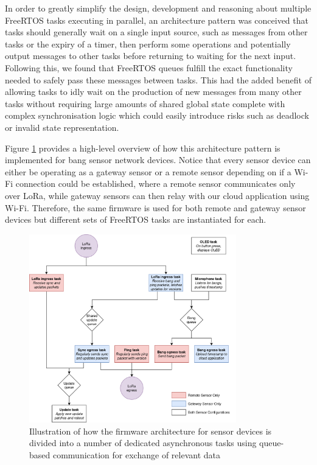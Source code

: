 \documentclass[conference]{IEEEtran}
\begin{document}
In order to greatly simplify the design, development and reasoning about multiple FreeRTOS tasks executing in parallel, an architecture pattern was conceived that tasks should generally wait on a single input source, such as messages from other tasks or the expiry of a timer, then perform some operations and potentially output messages to other tasks before returning to waiting for the next input. Following this, we found that FreeRTOS queues fulfill the exact functionality needed to safely pass these messages between tasks. This had the added benefit of allowing tasks to idly wait on the production of new messages from many other tasks without requiring large amounts of shared global state complete with complex synchronisation logic which could easily introduce risks such as deadlock or invalid state representation.

Figure \ref{firmware_figure} provides a high-level overview of how this architecture pattern is implemented for bang sensor network devices. Notice that every sensor device can either be operating as a gateway sensor or a remote sensor depending on if a Wi-Fi connection could be established, where a remote sensor communicates only over LoRa, while gateway sensors can then relay with our cloud application using Wi-Fi. Therefore, the same firmware is used for both remote and gateway sensor devices but different sets of FreeRTOS tasks are instantiated for each.

\begin{figure}[ht]
\centerline{\includegraphics[width=90mm]{images/firmware.png}}
\caption{Illustration of how the firmware architecture for sensor devices is divided into a number of dedicated asynchronous tasks using queue-based communication for exchange of relevant data}
\label{firmware_figure}
\end{figure}
\end{document}
